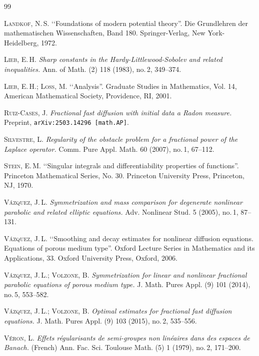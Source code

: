 \documentclass[leqno,12pt]{amsart}
\theoremstyle{definition}
\theoremstyle{remark}
\numberwithin{equation}{section}
\begin{document}
\begin{thebibliography}{99}


    \textsc{Landkof, N.\,S.}
    \lq\lq Foundations of modern potential theory''.  
    Die Grundlehren der mathematischen Wissenschaften, Band 180. Springer-Verlag, New York-Heidelberg, 1972.

      \textsc{Lieb, E.\,H.}  
       \emph{Sharp constants in the Hardy-Littlewood-Sobolev and related inequalities.}
     Ann. of Math. (2) 118 (1983), no.\,2, 349--374.

    \textsc{Lieb, E.\,H.; Loss, M.}
    \lq\lq Analysis''. Graduate Studies in Mathematics, Vol. 14, American Mathematical Society, Providence, RI, 2001.

    \textsc{Ruiz-Cases, J.} 
    \emph{Fractional fast diffusion with initial data a Radon measure.} Preprint, \texttt{arXiv:2503.14296 [math.AP]}.

    \textsc{Silvestre, L.} 
    \emph{Regularity of the obstacle problem for a fractional power of the Laplace operator.}
    Comm. Pure Appl. Math. 60 (2007), no.\,1, 67--112.

     \textsc{Stein, E.\,M.} 
     \lq\lq Singular integrals and differentiability properties of functions''. 
     Princeton Mathematical Series, No. 30. Princeton University Press, Princeton, NJ, 1970.


    \textsc{Vázquez, J.\,L.} 
    \emph{Symmetrization and mass comparison for degenerate nonlinear parabolic and related elliptic equations.} Adv. Nonlinear Stud. 5 (2005), no.\,1, 87--131.
                

    \textsc{Vázquez, J.\,L.} \lq\lq Smoothing and decay estimates for nonlinear diffusion equations. Equations of porous medium type''. Oxford Lecture Series in Mathematics and its Applications, 33. Oxford University Press, Oxford, 2006.
    
    \textsc{Vázquez, J.\,L.; Volzone, B.}  
    \emph{Symmetrization for linear and nonlinear fractional parabolic equations of porous medium type.} 
    J. Math. Pures Appl. (9) 101 (2014), no.\,5, 553--582.

\textsc{Vázquez, J.\,L.; Volzone, B.}
\emph{Optimal estimates for fractional fast diffusion equations.}
J. Math. Pures Appl. (9) 103 (2015), no.\,2, 535--556.

    \textsc{V\'eron, L.}  
    \emph{Effets régularisants de semi-groupes non linéaires dans des espaces de Banach.} (French) 
    Ann. Fac. Sci. Toulouse Math. (5) 1 (1979), no.\,2, 171--200.
   
\end{thebibliography}
\end{document}
